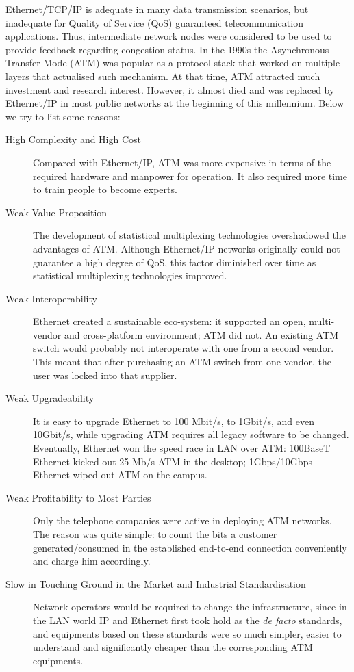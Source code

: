 Ethernet/TCP/IP is adequate in many data transmission scenarios, but inadequate for Quality of Service (QoS) guaranteed telecommunication applications. Thus, intermediate network nodes were considered to be used to provide feedback regarding congestion status. In the 1990s the Asynchronous Transfer Mode (ATM) was popular as a protocol stack that worked on multiple layers that actualised such mechanism. At that time, ATM attracted much investment and research interest. However, it almost died and was replaced by Ethernet/IP in most public networks at the beginning of this millennium. Below we try to list some reasons: 

\begin{description}
	\item[High Complexity and High Cost] Compared with Ethernet/IP, ATM was more expensive in terms of the required hardware and manpower for operation. It also required more time to train people to become experts. 
	\item[Weak Value Proposition] The development of statistical multiplexing technologies overshadowed the advantages of ATM. Although Ethernet/IP networks originally could not guarantee a high degree of QoS, this factor diminished over time as statistical multiplexing technologies improved.  
	\item[Weak Interoperability] Ethernet created a sustainable eco-system: it supported an open, multi-vendor and cross-platform environment; ATM did not. An existing ATM switch would probably not interoperate with one from a second vendor. This meant that after purchasing an ATM switch from one vendor, the user was locked into that supplier. 
	\item[Weak Upgradeability] It is easy to upgrade Ethernet to 100 Mbit/s, to 1Gbit/s, and even 10Gbit/s, while upgrading ATM requires all legacy software to be changed. Eventually, Ethernet won the speed race in LAN over ATM: 100BaseT Ethernet kicked out 25 Mb/s ATM in the desktop; 1Gbps/10Gbps Ethernet wiped out ATM on the campus. 
	\item[Weak Profitability to Most Parties] Only the telephone companies were active in deploying ATM networks. The reason was quite simple: to count the bits a customer generated/consumed in the established end-to-end connection conveniently and charge him accordingly.  
	\item[Slow in Touching Ground in the Market and Industrial Standardisation] Network operators would be required to change the infrastructure, since in the LAN world IP and Ethernet first took hold as the \textit{de facto} standards, and equipments based on these standards were so much simpler, easier to understand and significantly cheaper than the corresponding ATM equipments.
\end{description}

